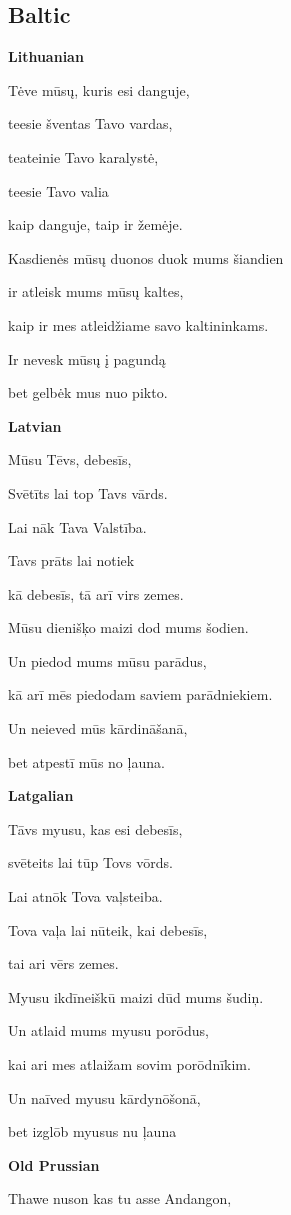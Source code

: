 \subsection{Baltic}

\textbf{Lithuanian}

Tėve mūsų, kuris esi danguje, 

teesie šventas Tavo vardas,

teateinie Tavo karalystė,

teesie Tavo valia

kaip danguje, taip ir žemėje.

Kasdienės mūsų duonos duok mums šiandien

ir atleisk mums mūsų kaltes,

kaip ir mes atleidžiame savo kaltininkams.

Ir nevesk mūsų į pagundą

bet gelbėk mus nuo pikto.

\textbf{Latvian}

Mūsu Tēvs, debesīs,

Svētīts lai top Tavs vārds.

Lai nāk Tava Valstība.

Tavs prāts lai notiek

kā debesīs, tā arī virs zemes.

Mūsu dienišķo maizi dod mums šodien.

Un piedod mums mūsu parādus,

kā arī mēs piedodam saviem parādniekiem.

Un neieved mūs kārdināšanā,

bet atpestī mūs no ļauna.

\textbf{Latgalian}

Tāvs myusu, kas esi debesīs,

svēteits lai tūp Tovs vōrds.

Lai atnōk Tova vaļsteiba.

Tova vaļa lai nūteik, kai debesīs,

tai ari vērs zemes.

Myusu ikdīneiškū maizi dūd mums šudiņ.

Un atlaid mums myusu porōdus,

kai ari mes atlaižam sovim porōdnīkim.

Un naīved myusu kārdynōšonā,

bet izglōb myusus nu ļauna

\textbf{Old Prussian}

Thawe nuson kas tu asse Andangon,

